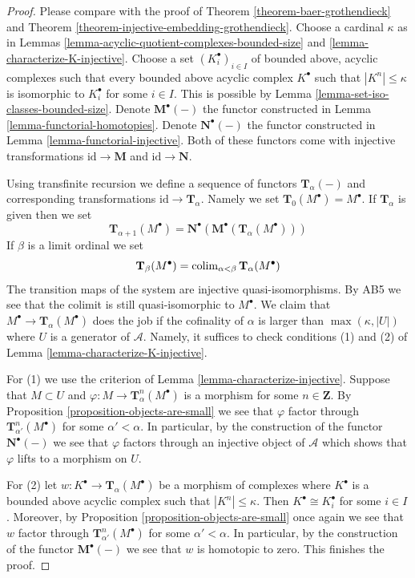 \begin{proof}
Please compare with the proof of
Theorem \ref{theorem-baer-grothendieck}
and
Theorem \ref{theorem-injective-embedding-grothendieck}.
Choose a cardinal $\kappa$ as in
Lemmas \ref{lemma-acyclic-quotient-complexes-bounded-size} and
\ref{lemma-characterize-K-injective}.
Choose a set $(K_i^\bullet)_{i \in I}$
of bounded above, acyclic complexes
such that every bounded above acyclic complex $K^\bullet$
such that $|K^n| \leq \kappa$ is isomorphic to $K_i^\bullet$ for some
$i \in I$. This is possible by
Lemma \ref{lemma-set-iso-classes-bounded-size}.
Denote $\mathbf{M}^\bullet(-)$ the functor constructed in
Lemma \ref{lemma-functorial-homotopies}.
Denote $\mathbf{N}^\bullet(-)$ the functor constructed in
Lemma \ref{lemma-functorial-injective}.
Both of these functors come with injective transformations
$\text{id} \to \mathbf{M}$ and $\text{id} \to \mathbf{N}$.

\medskip\noindent
Using transfinite recursion we define a sequence of functors
$\mathbf{T}_\alpha(-)$ and corresponding transformations
$\text{id} \to \mathbf{T}_\alpha$. Namely we set
$\mathbf{T}_0(M^\bullet) = M^\bullet$. If $\mathbf{T}_\alpha$ is
given then we set
$$
\mathbf{T}_{\alpha + 1}(M^\bullet) =
\mathbf{N}^\bullet(\mathbf{M}^\bullet(\mathbf{T}_\alpha(M^\bullet)))
$$
If $\beta$ is a limit ordinal we set
$$
\mathbf{T}_\beta(M^\bullet) =
\mathop{\mathrm{colim}}\nolimits_{\alpha < \beta} \mathbf{T}_\alpha(M^\bullet)
$$
The transition maps of the system are injective quasi-isomorphisms.
By AB5 we see that the colimit is still quasi-isomorphic to $M^\bullet$.
We claim that $M^\bullet \to \mathbf{T}_\alpha(M^\bullet)$
does the job if the cofinality of $\alpha$ is larger than
$\max(\kappa, |U|)$ where $U$ is a generator of $\mathcal{A}$.
Namely, it suffices to check conditions (1) and (2) of
Lemma \ref{lemma-characterize-K-injective}.

\medskip\noindent
For (1) we use the criterion of
Lemma \ref{lemma-characterize-injective}.
Suppose that $M \subset U$ and $\varphi : M \to \mathbf{T}^n_\alpha(M^\bullet)$
is a morphism for some $n \in \mathbf{Z}$. By
Proposition \ref{proposition-objects-are-small}
we see that $\varphi$ factor through
$\mathbf{T}^n_{\alpha'}(M^\bullet)$ for some $\alpha' < \alpha$.
In particular, by the construction of the functor
$\mathbf{N}^\bullet(-)$ we see that $\varphi$ factors through
an injective object of $\mathcal{A}$ which shows that $\varphi$
lifts to a morphism on $U$.

\medskip\noindent
For (2) let $w : K^\bullet  \to \mathbf{T}_\alpha(M^\bullet)$
be a morphism of complexes where $K^\bullet$ is a bounded above acyclic
complex such that $|K^n| \leq \kappa$. Then $K^\bullet \cong K_i^\bullet$
for some $i \in I$. Moreover, by
Proposition \ref{proposition-objects-are-small}
once again we see that $w$ factor through
$\mathbf{T}^n_{\alpha'}(M^\bullet)$ for some $\alpha' < \alpha$.
In particular, by the construction of the functor
$\mathbf{M}^\bullet(-)$ we see that $w$ is homotopic to zero.
This finishes the proof.
\end{proof}







